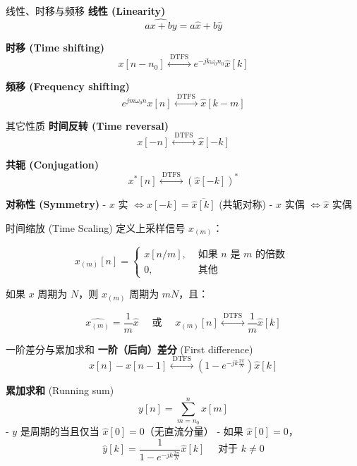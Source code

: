 \documentclass[
  ignorenonframetext,
]{beamer}
\begin{document}
\begin{frame}{线性、时移与频移}
\protect{}\label{ux7ebfux6027ux65f6ux79fbux4e0eux9891ux79fb}
\textbf{线性 (Linearity)} \[
\widehat{a x+b y}=a \hat{x}+b \hat{y}
\]

\textbf{时移 (Time shifting)} \[
x\left[n-n_{0}\right] \stackrel{\text { DTFS }}{\longleftrightarrow} e^{-j k \omega_{0} n_{0}} \hat{x}[k]
\]

\textbf{频移 (Frequency shifting)} \[
e^{j m \omega_{0} n} x[n] \stackrel{\text { DTFS }}{\longleftrightarrow} \hat{x}[k-m]
\]
\end{frame}

\begin{frame}{其它性质}
\protect{}\label{ux5176ux5b83ux6027ux8d28}
\textbf{时间反转 (Time reversal)} \[
x[-n] \stackrel{\text { DTFS }}{\longleftrightarrow} \hat{x}[-k]
\]

\textbf{共轭 (Conjugation)} \[
x^{*}[n] \stackrel{\text { DTFS }}{\longleftrightarrow}(\hat{x}[-k])^{*}
\]

\textbf{对称性 (Symmetry)} - \(x\) 实
\(\Longleftrightarrow \hat{x}[-k]=\overline{\hat{x}[k]}\) (共轭对称) -
\(x\) 实偶 \(\Longleftrightarrow \hat{x}\) 实偶
\end{frame}

\begin{frame}{时间缩放 (Time Scaling)}
\protect{}\label{ux65f6ux95f4ux7f29ux653e-time-scaling-1}
定义上采样信号 \(x_{(m)}\)：

\[
x_{(m)}[n]= \begin{cases}x[n / m], & \text { 如果 } n \text { 是 } m \text { 的倍数 } \\ 0, & \text { 其他 }\end{cases}
\]

如果 \(x\) 周期为 \(N\)，则 \(x_{(m)}\) 周期为 \(m N\)，且：

\[
\widehat{x_{(m)}}=\frac{1}{m} \hat{x} \quad \text { 或 } \quad x_{(m)}[n] \stackrel{\text { DTFS }}{\longleftrightarrow} \frac{1}{m} \hat{x}[k]
\]
\end{frame}

\begin{frame}{一阶差分与累加求和}
\protect{}\label{ux4e00ux9636ux5deeux5206ux4e0eux7d2fux52a0ux6c42ux548c}
\textbf{一阶（后向）差分} (First difference) \[
x[n]-x[n-1] \stackrel{\text { DTFS }}{\longleftrightarrow}\left(1-e^{-j k \frac{2 \pi}{N}}\right) \hat{x}[k]
\]

\textbf{累加求和} (Running sum) \[
y[n]=\sum_{m=n_{0}}^{n} x[m]
\] - \(y\) 是周期的当且仅当 \(\hat{x}[0]=0\)（无直流分量） - 如果
\(\hat{x}[0]=0\)， \[
\hat{y}[k]=\frac{1}{1-e^{-j k \frac{2 \pi}{N}}} \hat{x}[k] \quad \text { 对于 } k \neq 0
\]
\end{frame}
\end{document}
